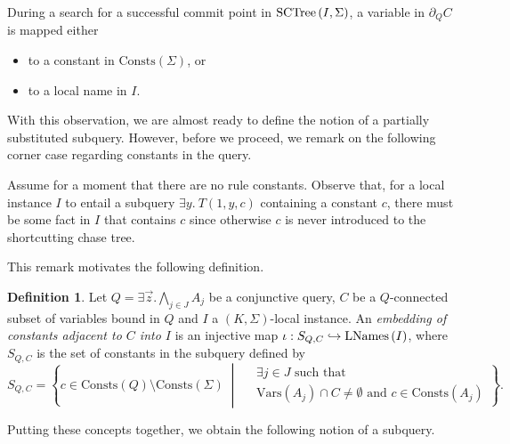 \documentclass[12pt]{report}
\theoremstyle{plain}
\theoremstyle{definition}
\newtheorem{definition}[theorem]{Definition}
\def\Vars{{\mathrm{Vars}}}
\def\Consts{{\mathrm{Consts}}}
\newcommand{\SCTree}[2]{\ensuremath{\normalfont{\textrm{SCTree}} \left( #1, #2 \right)}}
\newcommand{\LNames}[1]{\ensuremath{\normalfont{\textrm{LNames}} \left( #1 \right)}}
\begin{document}
During a search for a successful commit point in $\SCTree{I}{\Sigma}$, a variable in $\partial_Q C$ is mapped either
\begin{itemize}
  \item to a constant in $\Consts(\Sigma)$, or
  \item to a local name in $I$.
\end{itemize}

With this observation, we are almost ready to define the notion of a partially substituted subquery. However, before we proceed, we remark on the following corner case regarding constants in the query.

Assume for a moment that there are no rule constants. Observe that, for a local instance $I$ to entail a subquery $\exists y.\ T(1, y, c)$ containing a constant $c$, there must be some fact in $I$ that contains $c$ since otherwise $c$ is never introduced to the shortcutting chase tree.

This remark motivates the following definition.

\begin{definition}
  Let $Q = \exists \vec{z}. \bigwedge_{j \in J} A_j$ be a conjunctive query, $C$ be a $Q$-connected subset of variables bound in $Q$ and $I$ a $(K, \Sigma)$-local instance. An \emph{embedding of constants adjacent to $C$ into $I$} is an injective map $\iota: S_{Q, C} \hookrightarrow \LNames{I}$, where $S_{Q, C}$ is the set of constants in the subquery defined by $$
  S_{Q, C} = \left\{
      c \in \Consts(Q) \setminus \Consts(\Sigma)
        \;\middle|\;
      \begin{aligned}
        & \exists j \in J \text{ such that } \\
        & \Vars(A_j) \cap C \neq \emptyset \text{ and } c \in \Consts(A_j)
      \end{aligned}
    \right\}.
  $$
\end{definition}

Putting these concepts together, we obtain the following notion of a subquery.
\end{document}
